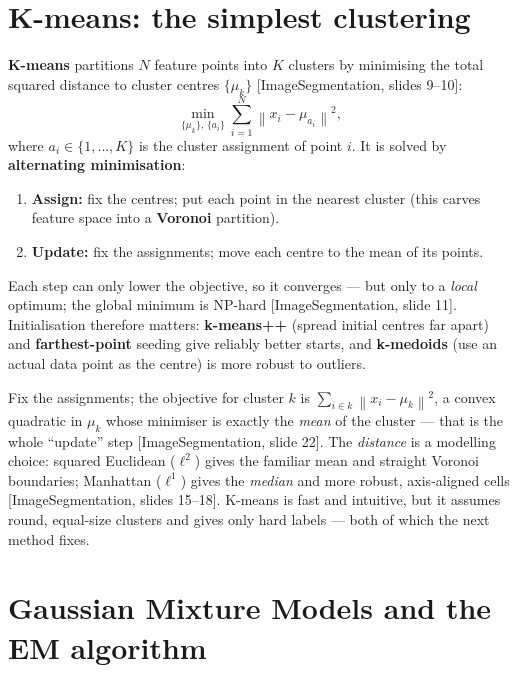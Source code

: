 \documentclass[11pt]{article}
\newcommand{\norm}[1]{\left\lVert #1 \right\rVert}
\newcommand{\deck}[1]{\textsf{\small[#1]}}
\begin{document}
\section{K-means: the simplest clustering}

\textbf{K-means} partitions $N$ feature points into $K$ clusters by minimising the
total squared distance to cluster centres $\{\mu_k\}$
\deck{ImageSegmentation, slides 9--10}:
\[
\min_{\{\mu_k\},\,\{a_i\}} \sum_{i=1}^{N} \norm{x_i - \mu_{a_i}}^2,
\]
where $a_i\in\{1,\dots,K\}$ is the cluster assignment of point $i$. It is solved
by \textbf{alternating minimisation}:
\begin{enumerate}[nosep,leftmargin=*]
  \item \textbf{Assign:} fix the centres; put each point in the nearest cluster
  (this carves feature space into a \textbf{Voronoi} partition).
  \item \textbf{Update:} fix the assignments; move each centre to the mean of its
  points.
\end{enumerate}
Each step can only lower the objective, so it converges --- but only to a
\emph{local} optimum; the global minimum is NP-hard \deck{ImageSegmentation,
slide 11}. Initialisation therefore matters: \textbf{k-means++} (spread initial
centres far apart) and \textbf{farthest-point} seeding give reliably better
starts, and \textbf{k-medoids} (use an actual data point as the centre) is more
robust to outliers.

\begin{notebox}
Fix the assignments; the objective for cluster $k$ is $\sum_{i\in k}\norm{x_i-\mu_k}^2$,
a convex quadratic in $\mu_k$ whose minimiser is exactly the \emph{mean} of the
cluster --- that is the whole ``update'' step \deck{ImageSegmentation, slide 22}.
The \emph{distance} is a modelling choice: squared Euclidean ($\ell^2$) gives the
familiar mean and straight Voronoi boundaries; Manhattan ($\ell^1$) gives the
\emph{median} and more robust, axis-aligned cells \deck{ImageSegmentation, slides
15--18}. K-means is fast and intuitive, but it assumes round, equal-size clusters
and gives only hard labels --- both of which the next method fixes.
\end{notebox}

\section{Gaussian Mixture Models and the EM algorithm}
\end{document}
